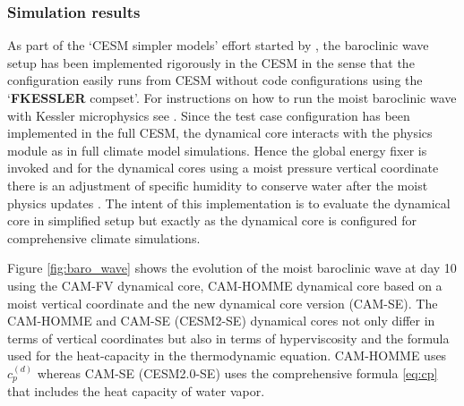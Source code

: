 \documentclass{agujournal}
\begin{document}

\subsubsection{Simulation results}
As part of the `CESM simpler models' effort started by \citet{CESM_SIMPLER_MODELS}, the baroclinic wave setup has been implemented rigorously in the CESM in the sense that the configuration easily runs from CESM without code configurations using the `{\bf{FKESSLER}} compset'. For instructions on how to run the moist baroclinic wave with Kessler microphysics see \citet{FKESSLER}. Since the test case configuration has been implemented in the full CESM, the dynamical core interacts with the physics module as in full climate model simulations. Hence the global energy fixer is invoked \citep{WOHTTV2015JAMES} and for the dynamical cores using a moist pressure vertical coordinate there is an adjustment of specific humidity to conserve water after the moist physics updates \citep[see Section 3.1.6 in ][]{CAM5}. The intent of this implementation is to evaluate the dynamical core in simplified setup but exactly as the dynamical core is configured for comprehensive climate simulations.

Figure \ref{fig:baro_wave} shows the evolution of the moist baroclinic wave at day 10 using the CAM-FV \citep[Finite-Volume; ][]{L2004MWR} dynamical core, CAM-HOMME dynamical core based on a moist vertical coordinate and the new dynamical core version (CAM-SE). The CAM-HOMME and CAM-SE (CESM2-SE) dynamical cores not only differ in terms of vertical coordinates but also in terms of hyperviscosity and the formula used for the heat-capacity in the thermodynamic equation. CAM-HOMME uses $c_p^{(d)}$ whereas CAM-SE (CESM2.0-SE) uses the comprehensive formula \eqref{eq:cp} that includes the heat capacity of water vapor.
\end{document}
